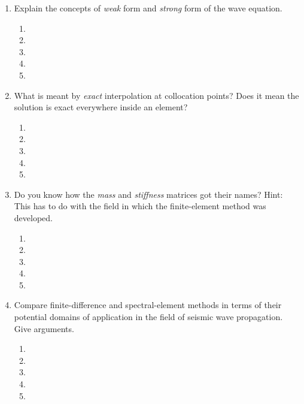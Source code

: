 \begin{enumerate}
\begin{enumerate}
\item[] 
\end{enumerate}
\item
Explain the concepts of {\it weak} form and {\it strong} form of the wave equation. 
\begin{enumerate}
\item[]
\item[]
\item[] 
\item[]
\item[] 
\end{enumerate}
\item
What is meant by {\it exact} interpolation at collocation points? Does it  mean the solution is exact everywhere inside an element? 
\begin{enumerate}
\item[]
\item[]
\item[] 
\item[]
\item[] 
\end{enumerate}
\item
Do you know how the {\it mass} and  {\it stiffness} matrices got their names? Hint: This has to do with the field in which the finite-element method was developed. 
\begin{enumerate}
\item[]
\item[]
\item[] 
\item[]
\item[] 
\end{enumerate}
\item
Compare finite-difference and spectral-element methods in terms of their potential domains of application in the field of seismic wave propagation. Give arguments.
\begin{enumerate}
\item[]
\item[]
\item[] 
\item[]
\item[] 
\end{enumerate}
\end{enumerate}

